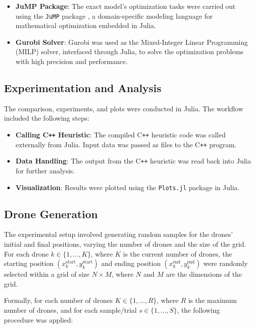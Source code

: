\begin{itemize}
\item \textbf{JuMP Package}: The exact model's optimization tasks were carried out using the \texttt{JuMP} package \cite{JuMPLubin2023}, a domain-specific modeling language for mathematical optimization embedded in Julia.
\item \textbf{Gurobi Solver}: Gurobi was used as the Mixed-Integer Linear Programming (MILP) solver, interfaced through Julia, to solve the optimization problems with high precision and performance.
\end{itemize}

\subsection{Experimentation and Analysis}

The comparison, experiments, and plots were conducted in Julia. The workflow included the following steps:

\begin{itemize}
\item \textbf{Calling C\texttt{++} Heuristic}: The compiled C\texttt{++} heuristic code was called externally from Julia. Input data was passed as files to the C\texttt{++} program.
\item \textbf{Data Handling}: The output from the C\texttt{++} heuristic was read back into Julia for further analysis.
\item \textbf{Visualization}: Results were plotted using the \texttt{Plots.jl} package in Julia.
\end{itemize}

\subsection{Drone Generation}

The experimental setup involved generating random samples for the drones' initial and final positions, varying the number of drones and the size of the grid. For each drone $k \in \{1, \ldots, K\}$, where $K$ is the current number of drones, the starting position $(x_k^{\text{start}}, y_k^{\text{start}})$ and ending position $(x_k^{\text{end}}, y_k^{\text{end}})$ were randomly selected within a grid of size $N \times M$, where $N$ and $M$ are the dimensions of the grid.

Formally, for each number of drones $K \in \{1, \ldots, R\}$, where $R$ is the maximum number of drones, and for each sample/trial $s \in \{1, \ldots, S\}$, the following procedure was applied:

